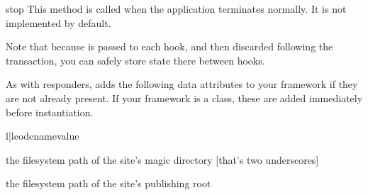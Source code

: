\begin{funcdesc}{stop}{} This method is called when the application terminates
normally. It is not implemented by default. \end{funcdesc}

Note that because  is passed to each hook, and then discarded
following the transaction, you can safely store state there between hooks.

As with responders,  adds the following data attributes to your
framework if they are not already present. If your framework is a class, these
are added immediately before instantiation.


\begin{tableii}{l|l}{code}{name}{value}

\lineii{__}
    {the filesystem path of the site's magic directory [that's two underscores]}

    {the filesystem path of the site's publishing root}

\end{tableii}
